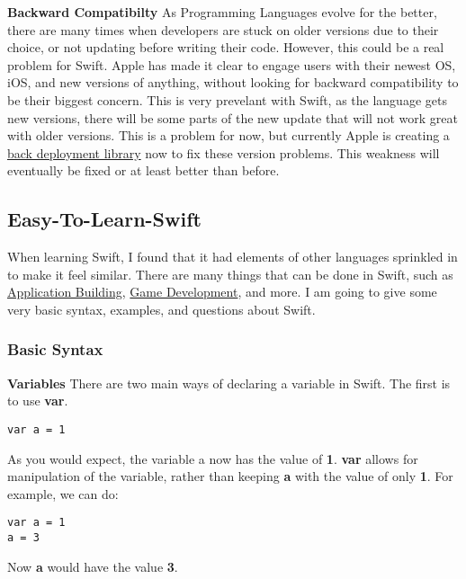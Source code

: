 \documentclass{article}
\theoremstyle{theorem}
\theoremstyle{definition}
\theoremstyle{remark}
\begin{document}
\noindent\textbf{Backward Compatibilty}\newline
As Programming Languages evolve for the better, there are many times when developers are stuck on older versions due to their choice, or not updating before writing their code. However, this could be a real problem for Swift. Apple has made it clear to engage users with their newest OS, iOS, and new versions of anything, without looking for backward compatibility to be their biggest concern. This is very prevelant with Swift, as the language gets new versions, there will be some parts of the new update that will not work great with older versions. This is a problem for now, but currently Apple is creating a \href{https://medium.com/@carlos.banos85/swift-5-5-concurrency-backward-compatibility-884fd9c284da}{back deployment library} now to fix these version problems. This weakness will eventually be fixed or at least better than before.

\subsection{Easy-To-Learn-Swift}
When learning Swift, I found that it had elements of other languages sprinkled in to make it feel similar. There are many things that can be done in Swift, such as \href{https://www.airpair.com/swift/building-swift-app-tutorial}{Application Building}, \href{https://caiocnoronha.medium.com/games-in-swift-88a72e441537}{Game Development}, and more. I am going to give some very basic syntax, examples, and questions about Swift.

\subsubsection{Basic Syntax}
\textbf{Variables}\newline
\noindent There are two main ways of declaring a variable in Swift. The first is to use \textbf{var}.
\begin{verbatim}
var a = 1
\end{verbatim}
\noindent As you would expect, the variable a now has the value of \textbf{1}. \textbf{var} allows for manipulation of the variable, rather than keeping \textbf{a} with the value of only \textbf{1}. For example, we can do:
\begin{verbatim}
var a = 1
a = 3
\end{verbatim}

\noindent Now \textbf{a} would have the value \textbf{3}. 
\end{document}

